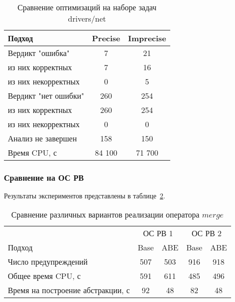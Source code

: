 \begin{center}
  \begin{table}[h]\footnotesize \centering
  	\label{table-drivers-opt}
    \caption{Сравнение оптимизаций на наборе задач drivers/net}
    \begin{tabular}{ | l | c | c |}
      \hline
      Подход         				& Precise	& Imprecise	  	\\ \hline
      Вердикт "ошибка" 				& 7  		& 21   			\\ 
  \hspace{0.5cm} из них корректных 	& 7 		& 16 		  	\\ 
  \hspace{0.5cm} из них некорректных & 0 		& 5 		    \\ \hline
      Вердикт "нет ошибки"  		& 260    	& 254    	    \\ 
  \hspace{0.5cm} из них корректных 	& 260 		& 254    	  	\\
  \hspace{0.5cm} из них некорректных & 0 		& 0    		   	\\ \hline
      Анализ не завершен       		& 158    	& 150    	   	\\ \hline
      Время CPU, с   				& 84 100 	& 71 700 	 	\\ 
      \hline
    \end{tabular}
  \end{table}
\end{center}


\subsubsection{Сравнение на ОС РВ}
Результаты экспериментов представлены в таблице~\ref{table-os-thread}.

\begin{center}
  \begin{table}[h]\footnotesize \centering
  	\label{table-os-thread}
    \caption{Сравнение различных вариантов реализации оператора $merge$}
    \begin{tabular}{ | l | c | c | c | c |}
      \hline
      		& 		\multicolumn{2}{|c|}{ОС РВ 1} & \multicolumn{2}{|c|}{ОС РВ 2} \\
      Подход         								& Base 	& ABE 	& Base 	& ABE 		\\ \hline
      Число предупреждений 							& 507  	& 503   & 916   & 918  		\\ 
      Общее время CPU, с							& 591  	& 611   & 485   & 496  		\\ 
\hspace{0.5cm} Время на построение абстракции, с 	& 92 	& 48   	& 82 	& 48   	\\
      \hline
    \end{tabular}
  \end{table}
\end{center}

